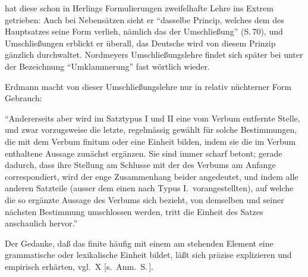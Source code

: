 \documentclass[output=paper]{langsci/langscibook}
\begin{document}
\citet{Nordmeyer1883} hat diese schon in Herlings Formulierungen zweifelhafte Lehre
ins Extrem getrieben: Auch bei Nebensätzen sieht er "`dasselbe Princip, welches dem
 des Hauptsatzes seine Form verlieh, nämlich das der Umschließung"' (S.\,70), und Umschließungen erblickt er überall, das Deutsche wird von diesem Prinzip gänzlich durchwaltet. Nordmeyers Umschließungslehre findet sich später bei \citet{Drach1937} unter der Bezeichnung "`Umklammerung"' fast wörtlich wieder.

Erdmann macht von dieser Umschließungslehre nur in relativ nüchterner Form
Gebrauch:
\begin{exe}
\ex\label{ex:1-5-6}

"`Andererseits aber wird im Satztypus I und II eine vom Verbum entfernte
Stelle, und zwar vorzugsweise die letzte, regelmässig gewählt für solche Bestimmungen, die mit dem Verbum finitum  oder  eine Einheit bilden, indem sie die im Verbum enthaltene Aussage zunächst ergänzen. Sie sind immer scharf betont; gerade dadurch, dass ihre
Stellung am Schlusse mit der des Verbums am Anfange correspondiert,
wird der enge Zusammenhang beider angedeutet, und indem alle anderen
Satzteile (ausser dem einen nach Typus I.\ vorangestellten), auf welche die so
ergänzte Aussage des Verbums sich bezieht, von demselben und seiner
nächsten Bestimmung umschlossen werden, tritt die Einheit des Satzes
anschaulich hervor."' \citep[191]{Erdmann1886}
\end{exe}
Der Gedanke, daß das finite  häufig mit einem am  stehenden Element
eine grammatische oder lexikalische Einheit bildet, läßt sich präzise explizieren und
empirisch erhärten, vgl.\ X [s.\ Anm.\ S.\,\pageref{fn-herausgeber-topo}].\label{X:9}
\end{document}
